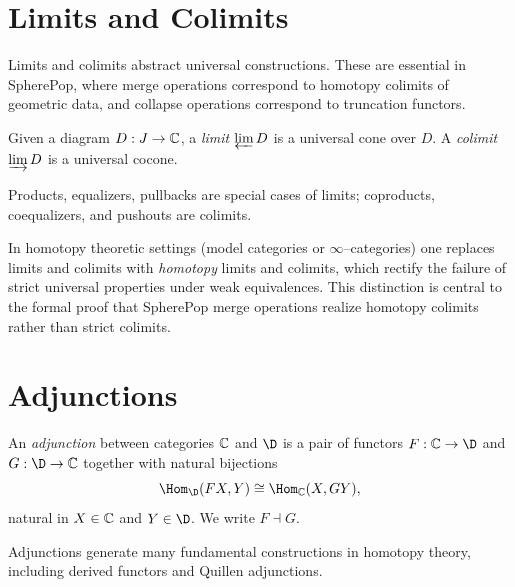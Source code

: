 \section{Limits and Colimits}

Limits and colimits abstract universal constructions.  These are essential in
SpherePop, where merge operations correspond to homotopy colimits of geometric
data, and collapse operations correspond to truncation functors.

\begin{definition}
Given a diagram $D:J\to\mathbb{C}$, a \emph{limit} $\varprojlim D$ is a universal cone
over $D$.  A \emph{colimit} $\varinjlim D$ is a universal cocone.
\end{definition}

\begin{example}
Products, equalizers, pullbacks are special cases of limits; coproducts,
coequalizers, and pushouts are colimits.
\end{example}

\begin{remark}
In homotopy theoretic settings (model categories or $\infty$--categories)
one replaces limits and colimits with \emph{homotopy} limits and colimits,
which rectify the failure of strict universal properties under weak
equivalences.  This distinction is central to the formal proof that SpherePop
merge operations realize homotopy colimits rather than strict colimits.
\end{remark}

\section{Adjunctions}

\begin{definition}
An \emph{adjunction} between categories $\mathbb{C}$ and $\D$ is a pair of functors
$F:\C\to\D$ and $G:\D\to\C$ together with natural bijections
\[
\Hom_\D(FX,Y)\cong \Hom_\C(X,GY),
\]
natural in $X\in\mathbb{C}$ and $Y\in\D$.  We write $F\dashv G$.
\end{definition}

Adjunctions generate many fundamental constructions in homotopy theory,
including derived functors and Quillen adjunctions.

